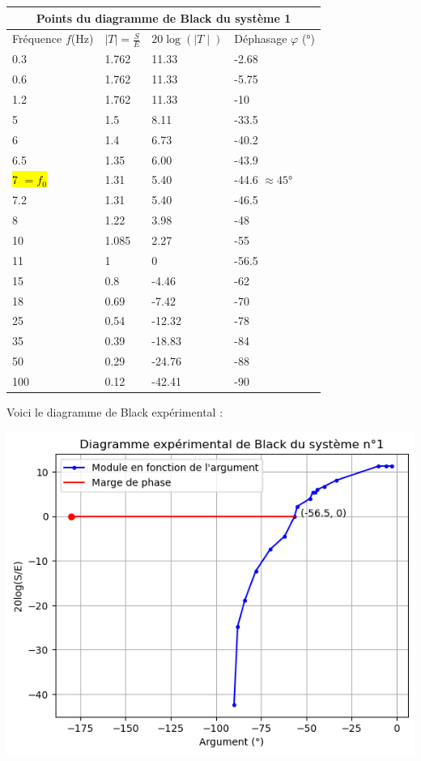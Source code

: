 \documentclass[12pt]{article}
\begin{document}
\begin{center}
\begin{tabular}{ |p{3cm}|p{3cm}|p{3cm}|p{3cm}| }
    \hline
    \multicolumn{4}{|c|}{Points du diagramme de Black du système 1} \\
    \hline
    Fréquence $f$(Hz) & $\mid T \mid = \frac{S}{E}$ & $20 \log(\mid T \mid)$ & Déphasage $\varphi $ (°)\\
    \hline
    0.3 & 1.762 & 11.33 & -2.68 \\
    0.6 & 1.762 & 11.33 & -5.75 \\
    1.2 & 1.762 & 11.33 & -10 \\
    5 & 1.5 &  8.11 & -33.5 \\
    6 & 1.4 &  6.73 & -40.2 \\
    6.5 & 1.35 &  6.00 & -43.9   \\
    \hl{7 $= f_0$}& 1.31 & 5.40 & -44.6 $\approx 45$°\\
    7.2 & 1.31 & 5.40 & -46.5 \\
    8 & 1.22 & 3.98 & -48\\
    10 & 1.085 & 2.27 & -55\\
    11 & 1 &  0 & -56.5 \\
    15 & 0.8 &  -4.46 & -62 \\
    18 & 0.69 & -7.42 &-70 \\
    25 & 0.54 & -12.32 & -78 \\
    35 & 0.39 & -18.83 & -84 \\
    50 & 0.29 & -24.76 & -88 \\
    100 & 0.12 & -42.41 & -90 \\
    \hline
    \end{tabular}
\end{center}

Voici le diagramme de Black expérimental : 
\begin{center}
    \includegraphics{TP1/Syst_1/Diagramme de Black experimental 2.1.png}
\end{center}
\end{document}
